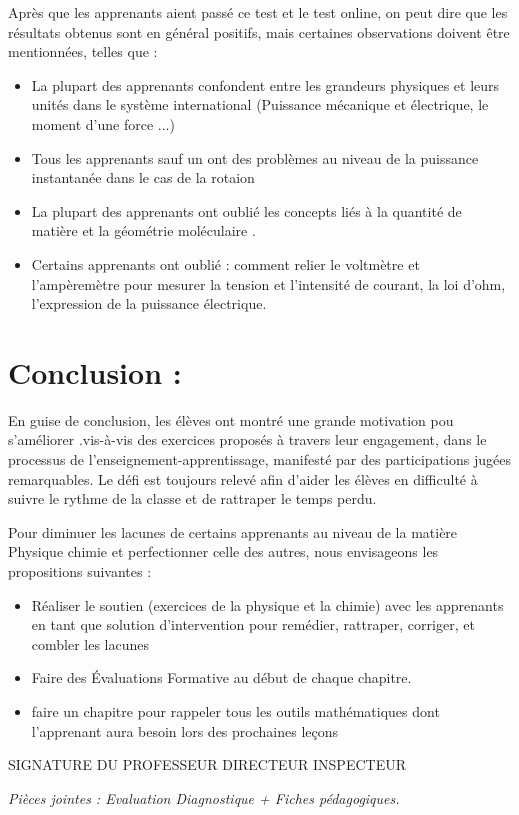 \documentclass[12pt]{article}
\begin{document}
Après que les apprenants aient passé ce test et le test online, on peut dire que les résultats obtenus sont en général positifs, mais certaines observations doivent être mentionnées, telles que :

\begin{itemize}
	\item La plupart des apprenants confondent entre les grandeurs physiques et leurs unités dans le système international (Puissance mécanique et électrique, le moment d'une force ...)
	\item Tous les apprenants sauf un ont des problèmes au niveau de la puissance instantanée dans le cas de la rotaion 

	\item  La plupart des apprenants ont oublié les concepts liés à la quantité de matière et la géométrie moléculaire . 
	\item Certains apprenants ont oublié : comment relier le voltmètre et l’ampèremètre pour mesurer la tension et l’intensité de courant,  la loi d’ohm, l’expression de la puissance électrique.
\end{itemize}

\section*{Conclusion : }
\hspace{2cm}En guise de conclusion, les élèves ont  montré  une grande motivation  pou s’améliorer .vis-à-vis des exercices proposés à travers leur engagement, dans le processus de l’enseignement-apprentissage, manifesté par des participations jugées remarquables. Le défi est toujours relevé afin d’aider les élèves en difficulté à suivre le rythme de la classe et de rattraper le temps perdu.

 Pour diminuer les lacunes de certains apprenants au niveau de la matière Physique chimie et perfectionner celle des autres, nous envisageons les propositions suivantes : 
 \begin{itemize}
	 \item Réaliser le soutien (exercices de la physique et la chimie) avec les apprenants en tant que solution d’intervention pour remédier, rattraper, corriger, et combler les lacunes
	 \item Faire des Évaluations Formative au début de chaque chapitre.
	 \item faire un chapitre pour rappeler tous les outils mathématiques dont l’apprenant aura besoin lors des prochaines leçons 

 \end{itemize}

 SIGNATURE DU PROFESSEUR \hspace{3cm} DIRECTEUR  \hspace{3cm} INSPECTEUR

 \vspace{3.85cm}
\emph{Pièces jointes : Evaluation Diagnostique + Fiches pédagogiques.}
\end{document}
